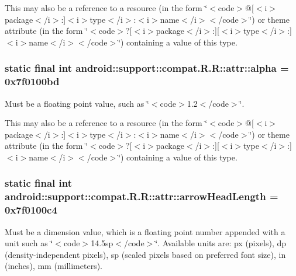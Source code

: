 This may also be a reference to a resource (in the form \char`\"{}$<$code$>$@\mbox{[}$<$i$>$package$<$/i$>$:\mbox{]}$<$i$>$type$<$/i$>$:$<$i$>$name$<$/i$>$$<$/code$>$\char`\"{}) or theme attribute (in the form \char`\"{}$<$code$>$?\mbox{[}$<$i$>$package$<$/i$>$:\mbox{]}\mbox{[}$<$i$>$type$<$/i$>$:\mbox{]}$<$i$>$name$<$/i$>$$<$/code$>$\char`\"{}) containing a value of this type. \hypertarget{classandroid_1_1support_1_1compat_1_1_r_1_1attr_d672ed76ec0f23c346497174fed6c8b8}{
\subsubsection[{alpha}]{\setlength{\rightskip}{0pt plus 5cm}static final int android::support::compat.R.R::attr::alpha = 0x7f0100bd}}
\label{classandroid_1_1support_1_1compat_1_1_r_1_1attr_d672ed76ec0f23c346497174fed6c8b8}


Must be a floating point value, such as \char`\"{}$<$code$>$1.2$<$/code$>$\char`\"{}. 

This may also be a reference to a resource (in the form \char`\"{}$<$code$>$@\mbox{[}$<$i$>$package$<$/i$>$:\mbox{]}$<$i$>$type$<$/i$>$:$<$i$>$name$<$/i$>$$<$/code$>$\char`\"{}) or theme attribute (in the form \char`\"{}$<$code$>$?\mbox{[}$<$i$>$package$<$/i$>$:\mbox{]}\mbox{[}$<$i$>$type$<$/i$>$:\mbox{]}$<$i$>$name$<$/i$>$$<$/code$>$\char`\"{}) containing a value of this type. \hypertarget{classandroid_1_1support_1_1compat_1_1_r_1_1attr_d9e4b7655da417e439e5497022381294}{
\subsubsection[{arrowHeadLength}]{\setlength{\rightskip}{0pt plus 5cm}static final int android::support::compat.R.R::attr::arrowHeadLength = 0x7f0100c4}}
\label{classandroid_1_1support_1_1compat_1_1_r_1_1attr_d9e4b7655da417e439e5497022381294}


Must be a dimension value, which is a floating point number appended with a unit such as \char`\"{}$<$code$>$14.5sp$<$/code$>$\char`\"{}. Available units are: px (pixels), dp (density-independent pixels), sp (scaled pixels based on preferred font size), in (inches), mm (millimeters). 

